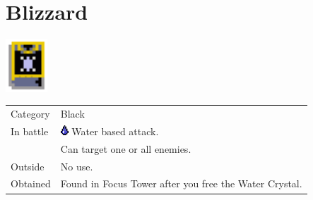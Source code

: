 \section{Blizzard}
\label{spell:blizzard}

\includegraphics[height=2cm,keepaspectratio]{./resources/spells/blizzard}

\begin{longtable}{ l p{9cm} }
	Category
	& Black
\\ %
	In battle
	& \includegraphics[height=1em,keepaspectratio]{./resources/effects/water} Water based attack. \\
	& Can target one or all enemies.
\\ %
	Outside
	& No use.
\\ %
	Obtained
	& Found in Focus Tower after you free the Water Crystal.
\end{longtable}
